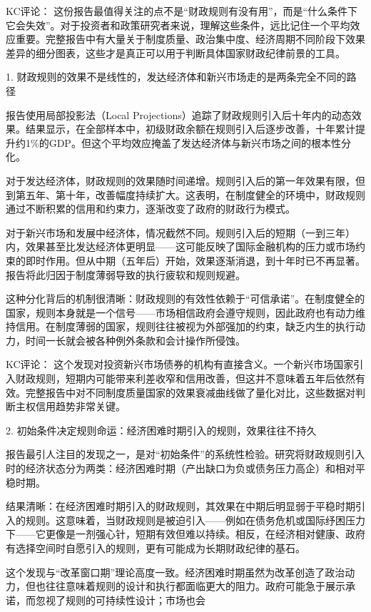 \documentclass[11pt]{ctexart}
\begin{document}
KC评论： 这份报告最值得关注的点不是“财政规则有没有用”，而是“什么条件下它会失效”。对于投资者和政策研究者来说，理解这些条件，远比记住一个平均效应重要。完整报告中有大量关于制度质量、政治集中度、经济周期不同阶段下效果差异的细分图表，这些才是真正可以用于判断具体国家财政纪律前景的工具。

1. 财政规则的效果不是线性的，发达经济体和新兴市场走的是两条完全不同的路径

报告使用局部投影法（Local Projections）追踪了财政规则引入后十年内的动态效果。结果显示，在全部样本中，初级财政余额在规则引入后逐步改善，十年累计提升约1\%的GDP。但这个平均效应掩盖了发达经济体与新兴市场之间的根本性分化。

对于发达经济体，财政规则的效果随时间递增。规则引入后的第一年效果有限，但到第五年、第十年，改善幅度持续扩大。这表明，在制度健全的环境中，财政规则通过不断积累的信用和约束力，逐渐改变了政府的财政行为模式。

对于新兴市场和发展中经济体，情况截然不同。规则引入后的短期（一到三年）内，效果甚至比发达经济体更明显——这可能反映了国际金融机构的压力或市场约束的即时作用。但从中期（五年后）开始，效果逐渐消退，到十年时已不再显著。报告将此归因于制度薄弱导致的执行疲软和规则规避。

这种分化背后的机制很清晰：财政规则的有效性依赖于“可信承诺”。在制度健全的国家，规则本身就是一个信号——市场相信政府会遵守规则，因此政府也有动力维持信用。在制度薄弱的国家，规则往往被视为外部强加的约束，缺乏内生的执行动力，时间一长就会被各种例外条款和会计操作所侵蚀。

KC评论： 这个发现对投资新兴市场债券的机构有直接含义。一个新兴市场国家引入财政规则，短期内可能带来利差收窄和信用改善，但这并不意味着五年后依然有效。完整报告中对不同制度质量国家的效果衰减曲线做了量化对比，这些数据对判断主权信用趋势非常关键。

2. 初始条件决定规则命运：经济困难时期引入的规则，效果往往不持久

报告最引人注目的发现之一，是对“初始条件”的系统性检验。研究将财政规则引入时的经济状态分为两类：经济困难时期（产出缺口为负或债务压力高企）和相对平稳时期。

结果清晰：在经济困难时期引入的财政规则，其效果在中期后明显弱于平稳时期引入的规则。这意味着，当财政规则是被迫引入——例如在债务危机或国际纾困压力下——它更像是一剂强心针，短期有效但难以持续。相反，在经济相对健康、政府有选择空间时自愿引入的规则，更有可能成为长期财政纪律的基石。

这个发现与“改革窗口期”理论高度一致。经济困难时期虽然为改革创造了政治动力，但也往往意味着规则的设计和执行都面临更大的阻力。政府可能急于展示承诺，而忽视了规则的可持续性设计；市场也会
\end{document}
